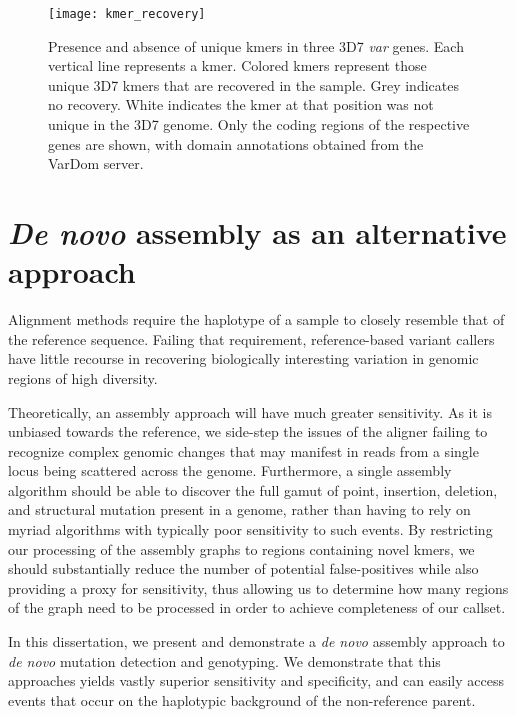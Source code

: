 \begin{sidewaysfigure}[h!]
  \centering
    \texttt{[image: kmer\_recovery]}
  \caption{Presence and absence of unique kmers in three 3D7 \textit{var} genes.  Each vertical line represents a kmer.  Colored kmers represent those unique 3D7 kmers that are recovered in the sample.  Grey indicates no recovery.  White indicates the kmer at that position was not unique in the 3D7 genome.  Only the coding regions of the respective genes are shown, with domain annotations obtained from the VarDom server\cite{Rask:2010fia}.}
  \label{fig:kmer_recovery}
\end{sidewaysfigure}

\section{\textit{De novo} assembly as an alternative approach}

Alignment methods require the haplotype of a sample to closely resemble that of the reference sequence.  Failing that requirement, reference-based variant callers have little recourse in recovering biologically interesting variation in genomic regions of high diversity.

Theoretically, an assembly approach will have much greater sensitivity.  As it is unbiased towards the reference, we side-step the issues of the aligner failing to recognize complex genomic changes that may manifest in reads from a single locus being scattered across the genome.  Furthermore, a single assembly algorithm should be able to discover the full gamut of point, insertion, deletion, and structural mutation present in a genome, rather than having to rely on myriad algorithms with typically poor sensitivity to such events.  By restricting our processing of the assembly graphs to regions containing novel kmers, we should substantially reduce the number of potential false-positives while also providing a proxy for sensitivity, thus allowing us to determine how many regions of the graph need to be processed in order to achieve completeness of our callset.

In this dissertation, we present and demonstrate a \textit{de novo} assembly approach to \textit{de novo} mutation detection and genotyping.  We demonstrate that this approaches yields vastly superior sensitivity and specificity, and can easily access events that occur on the haplotypic background of the non-reference parent.
